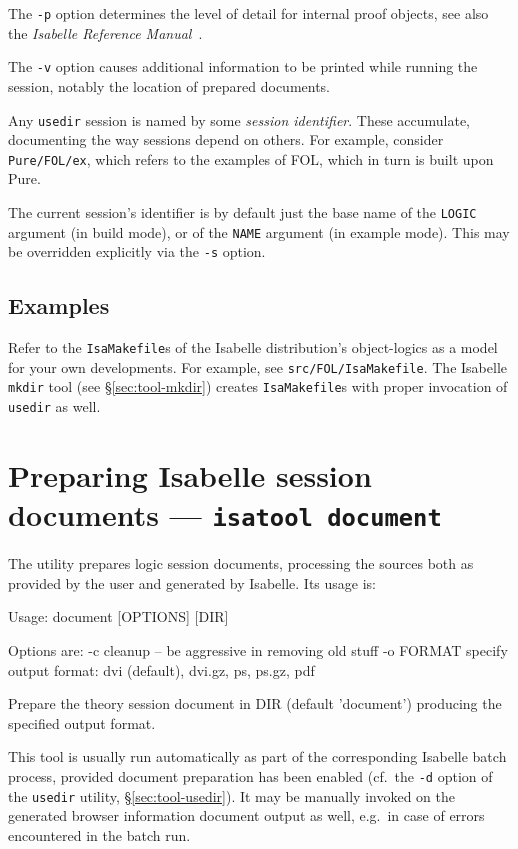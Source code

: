 \medskip The \texttt{-p} option determines the level of detail for internal
proof objects, see also the \emph{Isabelle Reference
  Manual}~\cite{isabelle-ref}.

\medskip The \texttt{-v} option causes additional information to be printed
while running the session, notably the location of prepared documents.

\medskip Any \texttt{usedir} session is named by some \emph{session
  identifier}. These accumulate, documenting the way sessions depend on
others. For example, consider \texttt{Pure/FOL/ex}, which refers to the
examples of FOL, which in turn is built upon Pure.

The current session's identifier is by default just the base name of the
\texttt{LOGIC} argument (in build mode), or of the \texttt{NAME} argument (in
example mode). This may be overridden explicitly via the \texttt{-s} option.


\subsection*{Examples}

Refer to the \texttt{IsaMakefile}s of the Isabelle distribution's
object-logics as a model for your own developments.  For example, see
\texttt{src/FOL/IsaMakefile}.  The Isabelle \texttt{mkdir} tool (see
\S\ref{sec:tool-mkdir}) creates \texttt{IsaMakefile}s with proper invocation
of \texttt{usedir} as well.


\section{Preparing Isabelle session documents --- \texttt{isatool document}}
\label{sec:tool-document}

The  utility prepares logic session documents, processing the
sources both as provided by the user and generated by Isabelle.  Its usage is:
\begin{ttbox}
Usage: document [OPTIONS] [DIR]

  Options are:
    -c           cleanup -- be aggressive in removing old stuff
    -o FORMAT    specify output format: dvi (default), dvi.gz, ps,
                 ps.gz, pdf

  Prepare the theory session document in DIR (default 'document')
  producing the specified output format.
\end{ttbox}
This tool is usually run automatically as part of the corresponding Isabelle
batch process, provided document preparation has been enabled (cf.\ the
\texttt{-d} option of the \texttt{usedir} utility, \S\ref{sec:tool-usedir}).
It may be manually invoked on the generated browser information document
output as well, e.g.\ in case of errors encountered in the batch run.

